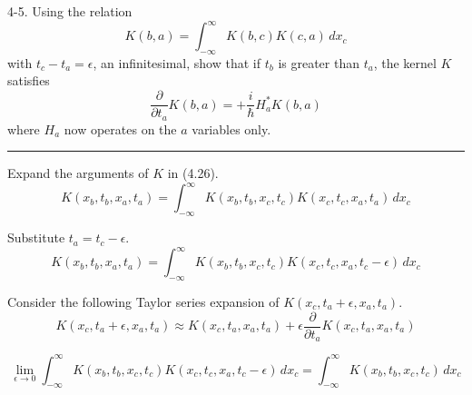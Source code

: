 \documentclass[12pt]{article}
\begin{document}
4-5.
Using the relation
\begin{equation*}
K(b,a)=\int_{-\infty}^\infty K(b,c)K(c,a)\,dx_c
\tag{4.26}
\end{equation*}
with $t_c-t_a=\epsilon$, an infinitesimal, show that if $t_b$ is greater than $t_a$,
the kernel $K$ satisfies
\begin{equation*}
\frac{\partial}{\partial t_a}K(b,a)=+\frac{i}{\hbar}H_a^*K(b,a)
\end{equation*}
where $H_a$ now operates on the $a$ variables only.

\bigskip
\hrule

\bigskip
Expand the arguments of $K$ in (4.26).
\begin{equation*}
K(x_b,t_b,x_a,t_a)=\int_{-\infty}^\infty K(x_b,t_b,x_c,t_c)K(x_c,t_c,x_a,t_a)\,dx_c
\end{equation*}

Substitute $t_a=t_c-\epsilon$.
\begin{equation*}
K(x_b,t_b,x_a,t_a)=\int_{-\infty}^\infty K(x_b,t_b,x_c,t_c)K(x_c,t_c,x_a,t_c-\epsilon)\,dx_c
\end{equation*}

Consider the following Taylor series expansion of $K(x_c,t_a+\epsilon,x_a,t_a)$.
\begin{equation*}
K(x_c,t_a+\epsilon,x_a,t_a)\approx K(x_c,t_a,x_a,t_a)+\epsilon\frac{\partial}{\partial t_a}K(x_c,t_a,x_a,t_a)
\end{equation*}

\begin{equation*}
\lim_{\epsilon\rightarrow0}\int_{-\infty}^\infty K(x_b,t_b,x_c,t_c)K(x_c,t_c,x_a,t_c-\epsilon)\,dx_c
=\int_{-\infty}^\infty K(x_b,t_b,x_c,t_c)\,dx_c
\end{equation*}

\end{document}
